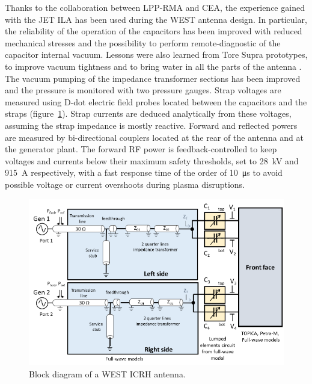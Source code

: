 \documentclass[12p]{iopart}
\begin{document}
Thanks to the collaboration between LPP-RMA and CEA, the experience gained with the JET ILA \cite{durodie2012-2} has been used during the WEST antenna design. In particular, the reliability of the operation of the capacitors has been improved with reduced mechanical stresses and the possibility to perform remote-diagnostic of the capacitor internal vacuum. Lessons were also learned from Tore Supra prototypes, to improve vacuum tightness and to bring water in all the parts of the antenna \cite{vulliez2008, vulliez2015}. The vacuum pumping of the impedance transformer sections has been improved and the pressure is monitored with two pressure gauges. Strap voltages are measured using D-dot electric field probes located between the capacitors and the straps (figure~\ref{fig:westicrhblockdiagram}). Strap currents are deduced analytically from these voltages, assuming the strap impedance is mostly reactive. Forward and reflected powers are measured by bi-directional couplers located at the rear of the antenna and at the generator plant. The forward RF power is feedback-controlled to keep voltages and currents below their maximum safety thresholds, set to \SI{28}{\kilo\volt} and \SI{915}{\ampere} respectively, with a fast response time of the order of \SI{10}{\micro\second} to avoid possible voltage or current overshoots during plasma disruptions.

\begin{figure}
	\centering
	\includegraphics[width=0.95\linewidth]{figures/WEST_ICRH_block_diagram}
	\caption{Block diagram of a WEST ICRH antenna.}
	\label{fig:westicrhblockdiagram}
\end{figure}
\end{document}
